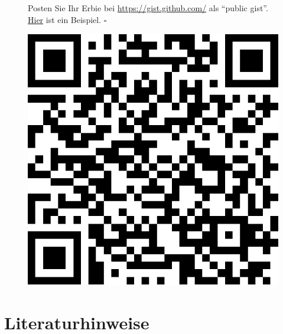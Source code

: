 \documentclass[
  letterpaper,
]{scrbook}
\theoremstyle{definition}
\theoremstyle{definition}
\theoremstyle{definition}
\theoremstyle{remark}
\begin{document}
\begin{tcolorbox}[enhanced jigsaw, colbacktitle=quarto-callout-tip-color!10!white, toptitle=1mm, colframe=quarto-callout-tip-color-frame, breakable, toprule=.15mm, bottomrule=.15mm, bottomtitle=1mm, left=2mm, opacitybacktitle=0.6, colback=white, arc=.35mm, coltitle=black, title=\textcolor{quarto-callout-tip-color}{\faLightbulb}\hspace{0.5em}{Tipp}, opacityback=0, rightrule=.15mm, leftrule=.75mm, titlerule=0mm]

\begin{figure}[H]

\begin{minipage}{0.80\linewidth}
Posten Sie Ihr Erbie bei \url{https://gist.github.com/} als
\enquote{public gist}.
\href{https://gist.github.com/sebastiansauer/0649a0453b5cc7c6a1d16ac760667215}{Hier}
ist ein Beispiel. \(\square\)\end{minipage}%
%
\begin{minipage}{0.20\linewidth}

\begin{center}
\includegraphics[width=0.75\linewidth,height=\textheight,keepaspectratio]{030-aufbereiten_files/figure-pdf/unnamed-chunk-51-1.pdf}
\end{center}

\end{minipage}%

\end{figure}%

\end{tcolorbox}

\section{Literaturhinweise}\label{literaturhinweise-2}
\end{document}
